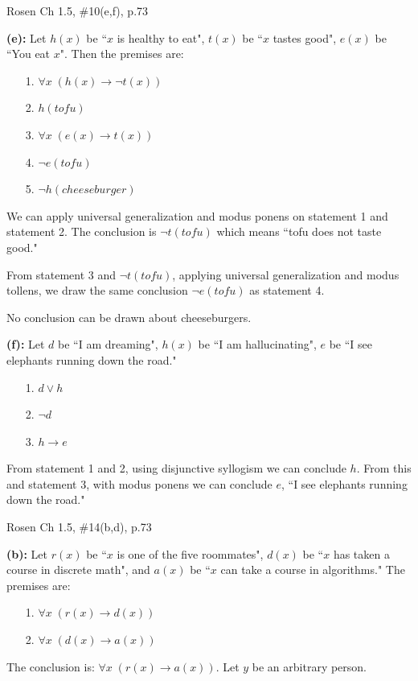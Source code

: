 \documentclass[12pt]{exam}
\begin{document}
\begin{questions}
\question Rosen Ch 1.5, \#10(e,f), p.73
    \begin{solution}
    \textbf{(e):} Let $h(x)$ be ``$x$ is healthy to eat", $t(x)$ be ``$x$ tastes good", $e(x)$ be ``You eat $x$".  Then the premises are:
    \begin{itemize}
        \item[1.] $\forall x\; (h(x) \rightarrow \neg t(x))$
        \item[2.] $h(tofu)$
        \item[3.] $\forall x\; (e(x) \rightarrow t(x))$
        \item[4.] $\neg e(tofu)$
        \item[5.] $\neg h(cheeseburger)$
    \end{itemize}

    \smallskip
    We can apply universal generalization and modus ponens on statement 1 and statement 2.  The conclusion is $\neg t(tofu)$ which means ``tofu does not taste good."

    From statement 3 and $\neg t(tofu)$, applying universal generalization and modus tollens, we draw the same conclusion $\neg e(tofu)$ as statement 4.

    No conclusion can be drawn about cheeseburgers.

    \medskip
    \textbf{(f):} Let $d$ be ``I am dreaming", $h(x)$ be ``I am hallucinating", $e$ be ``I see elephants running down
    the road."
    \begin{itemize}
        \item[1.] $d \vee h$
        \item[2.] $\neg d$
        \item[3.] $h \rightarrow e$
    \end{itemize}

    \smallskip
    From statement 1 and 2, using disjunctive syllogism we can
    conclude $h$. From this and statement 3, with modus ponens we
    can conclude $e$, ``I see elephants running down the road."
    \end{solution}


\question Rosen Ch 1.5, \#14(b,d), p.73
    \begin{solution}
    \textbf{(b):} Let $r(x)$ be ``$x$ is one of the five roommates", $d(x)$ be ``$x$ has taken a course in discrete math", and $a(x)$ be ``$x$ can take a course in algorithms." The premises are:
    \begin{itemize}
        \item[1.] $\forall x\;(r(x) \rightarrow d(x))$
        \item[2.] $\forall x\;(d(x) \rightarrow a(x))$
    \end{itemize}
    The conclusion is: $\forall x\;(r(x) \rightarrow a(x))$.  Let $y$ be an arbitrary person.


\end{solution}
\end{questions}
\end{document}
